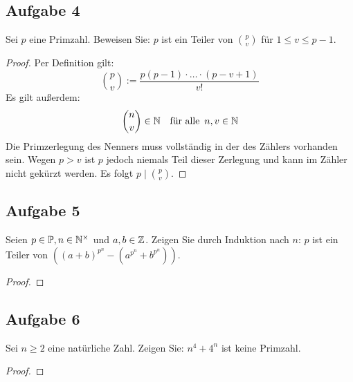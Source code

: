 \newpage
\subsection{Aufgabe 4}

Sei $p$ eine Primzahl. Beweisen Sie: $p$ ist ein Teiler von $\binom{p}{v}$
für $1 \leq v \leq p - 1$.
\begin{proof}
  Per Definition gilt:
  \begin{equation*}
    \binom{p}{v} := \frac{p(p-1) \cdot \ldots \cdot (p - v + 1)}{v!}
  \end{equation*}
  Es gilt außerdem:
  \begin{equation*}
    \binom{n}{v} \in \mathbb{N} \quad \text{für alle} \enspace n,v \in \mathbb{N}
  \end{equation*}
  Die Primzerlegung des Nenners muss
  vollständig in der des Zählers vorhanden sein.
  Wegen $p > v$ ist $p$ jedoch niemals Teil dieser Zerlegung und
  kann im Zähler nicht gekürzt werden.
  Es folgt $p \mid \binom{p}{v}$.
\end{proof}

\newpage
\subsection{Aufgabe 5}
Seien $p \in \mathbb{P}{}, n \in \mathbb{N}^\times{}$ und $a,b \in \mathbb{Z}{}$. Zeigen Sie durch Induktion
nach $n$: $p$ ist ein Teiler von
$((a + b)^{p^n} - (a^{p^n} + b^{p^n}))$.
\begin{proof}
\end{proof}

\newpage
\subsection{Aufgabe 6}
Sei $n \geq 2$ eine natürliche Zahl. Zeigen Sie: $n^4 + 4^n$ ist keine Primzahl.
\begin{proof}
\end{proof}